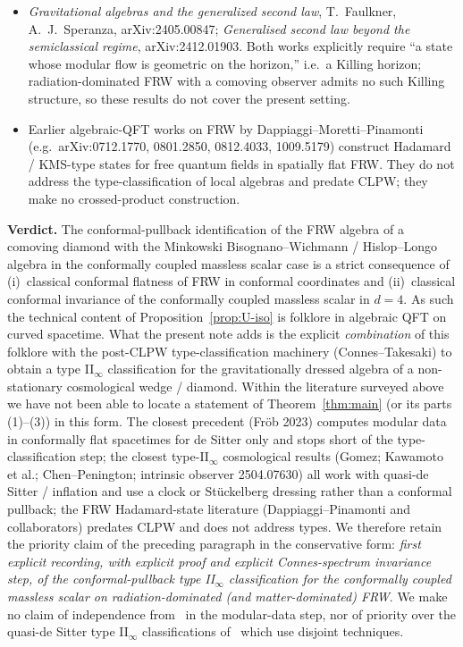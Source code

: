 \documentclass[11pt]{article}
\theoremstyle{definition}
\begin{document}
\begin{itemize}
\item \emph{Gravitational algebras and the generalized second law}, T.~Faulkner, A.~J.~Speranza, arXiv:2405.00847; \emph{Generalised second law beyond the semiclassical regime}, arXiv:2412.01903. Both works explicitly require ``a state whose modular flow is geometric on the horizon,'' i.e.\ a Killing horizon; radiation-dominated FRW with a comoving observer admits no such Killing structure, so these results do not cover the present setting.
\item Earlier algebraic-QFT works on FRW by Dappiaggi--Moretti--Pinamonti (e.g.\ arXiv:0712.1770, 0801.2850, 0812.4033, 1009.5179) construct Hadamard / KMS-type states for free quantum fields in spatially flat FRW. They do not address the type-classification of local algebras and predate CLPW; they make no crossed-product construction.
\end{itemize}

\noindent\textbf{Verdict.} The conformal-pullback identification of the FRW algebra of a comoving diamond with the Minkowski Bisognano--Wichmann / Hislop--Longo algebra in the conformally coupled massless scalar case is a strict consequence of (i)~classical conformal flatness of FRW in conformal coordinates and (ii)~classical conformal invariance of the conformally coupled massless scalar in $d=4$. As such the technical content of Proposition~\ref{prop:U-iso} is folklore in algebraic QFT on curved spacetime. What the present note adds is the explicit \emph{combination} of this folklore with the post-CLPW type-classification machinery (Connes--Takesaki) to obtain a type II$_\infty$ classification for the gravitationally dressed algebra of a non-stationary cosmological wedge / diamond. Within the literature surveyed above we have not been able to locate a statement of Theorem~\ref{thm:main} (or its parts (1)--(3)) in this form. The closest precedent (Fröb 2023) computes modular data in conformally flat spacetimes for de Sitter only and stops short of the type-classification step; the closest type-II$_\infty$ cosmological results (Gomez; Kawamoto et al.; Chen--Penington; intrinsic observer 2504.07630) all work with quasi-de Sitter / inflation and use a clock or Stückelberg dressing rather than a conformal pullback; the FRW Hadamard-state literature (Dappiaggi--Pinamonti and collaborators) predates CLPW and does not address types. We therefore retain the priority claim of the preceding paragraph in the conservative form: \emph{first explicit recording, with explicit proof and explicit Connes-spectrum invariance step, of the conformal-pullback type II$_\infty$ classification for the conformally coupled massless scalar on radiation-dominated (and matter-dominated) FRW}. We make no claim of independence from~\cite{Frob2023} in the modular-data step, nor of priority over the quasi-de Sitter type II$_\infty$ classifications of~\cite{KawamotoMoriTakahashi2022, ChenPenington2024} which use disjoint techniques.
\end{document}
